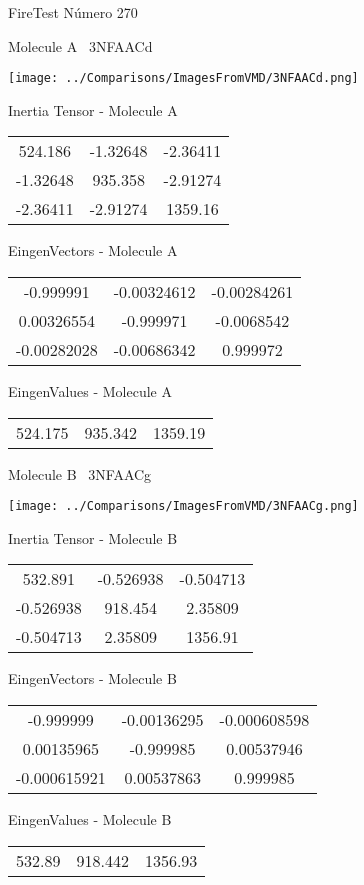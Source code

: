 \vtab[-3cm]
\begin{center}
{\large FireTest \tab Número 270}
\end{center}
\begin{multicols}{2}
\begin{center}

Molecule A \
3NFAACd

\texttt{[image: ../Comparisons/ImagesFromVMD/3NFAACd.png]}

Inertia Tensor - Molecule A \\
\begin{tabular}{|c c c|}
524.186	 & 	-1.32648	 & 	-2.36411	 \\
-1.32648	 & 	935.358	 & 	-2.91274	 \\
-2.36411	 & 	-2.91274	 & 	1359.16
\end{tabular}

\vtab
 EingenVectors - Molecule A     \\
\begin{tabular}{|c c c|}
-0.999991	 & 	-0.00324612	 & 	-0.00284261	 \\
0.00326554	 & 	-0.999971	 & 	-0.0068542	 \\
-0.00282028	 & 	-0.00686342	 & 	0.999972
\end{tabular}

\vtab
 EingenValues - Molecule A     \\
\begin{tabular}{|c c c|}
524.175	 & 	935.342	 & 	1359.19	 \\
\end{tabular}
\columnbreak

Molecule B \
3NFAACg

\texttt{[image: ../Comparisons/ImagesFromVMD/3NFAACg.png]}

Inertia Tensor - Molecule B \\
\begin{tabular}{|c c c|}
532.891	 & 	-0.526938	 & 	-0.504713	 \\
-0.526938	 & 	918.454	 & 	2.35809	 \\
-0.504713	 & 	2.35809	 & 	1356.91
\end{tabular}

\vtab
 EingenVectors - Molecule B     \\
\begin{tabular}{|c c c|}
-0.999999	 & 	-0.00136295	 & 	-0.000608598	 \\
0.00135965	 & 	-0.999985	 & 	0.00537946	 \\
-0.000615921	 & 	0.00537863	 & 	0.999985
\end{tabular}

\vtab
 EingenValues - Molecule B     \\
\begin{tabular}{|c c c|}
532.89	 & 	918.442	 & 	1356.93	 \\
\end{tabular}

\end{center}
\end{multicols}

